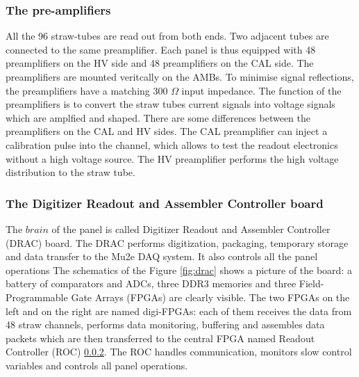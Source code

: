 \subsubsection{The pre-amplifiers}\label{preampss}
All the 96 straw-tubes are read out from both ends. 
Two adjacent tubes are connected to the same preamplifier. 
Each panel is thus equipped with 48 preamplifiers on the HV 
side and 48 preamplifiers on the CAL side. The preamplifiers 
are mounted veritcally on the AMBs. To minimise signal reflections, 
the preamplifiers have a matching 300 $\Omega$ input impedance. 
The function of the preamplifiers is to convert the straw tubes 
current signals into voltage signals which are amplfied and shaped. 
There are some differences between the preamplifiers on the CAL and 
HV sides. The CAL preamplifier can inject a calibration pulse into 
the channel, which allows to test the readout electronics without a 
high voltage source. The HV preamplifier performs the high voltage 
distribution to the straw tube.
\subsubsection{The Digitizer Readout and Assembler Controller board}\label{DRAC}
The $brain$ of the panel is called Digitizer Readout and Assembler Controller (DRAC) board. 
The DRAC performs digitization, packaging, temporary storage and data transfer to 
the Mu2e DAQ system. It also controls all the panel operations The schematics of the 
Figure \ref{fig:drac} shows a picture of the board: a battery of comparators 
and ADCs, three DDR3 memories and three Field-Programmable Gate Arrays (FPGAs) 
are clearly visible. 
The two FPGAs on the left and on the right are named digi-FPGAs: 
each of them receives the data from 48 straw channels, performs data 
monitoring, buffering and assembles data packets which are then 
transferred to the central FPGA named Readout Controller (ROC) \ref{DRAC}. 
The ROC handles communication, monitors slow control variables and 
controls all panel operations.

